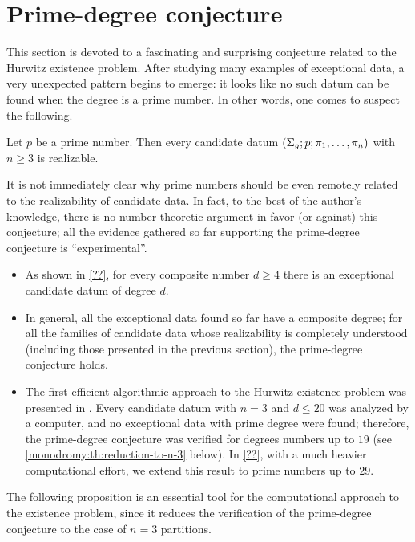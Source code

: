 \section{Prime-degree conjecture}

This section is devoted to a fascinating and surprising conjecture related to the Hurwitz existence problem. After studying many examples of exceptional data, a very unexpected pattern begins to emerge: it looks like no such datum can be found when the degree is a prime number. In other words, one comes to suspect the following.

\begin{prime-degree-conjecture*}
Let $p$ be a prime number. Then every candidate datum $(\Sigma_{g};p;\pi_1,\ldots,\pi_n)$ with $n\ge 3$ is realizable.
\end{prime-degree-conjecture*}

It is not immediately clear why prime numbers should be even remotely related to the realizability of candidate data. In fact, to the best of the author's knowledge, there is no number-theoretic argument in favor (or against) this conjecture; all the evidence gathered so far supporting the prime-degree conjecture is ``experimental''.
\begin{itemize}
\item As shown in \cref{??}, for every composite number $d\ge 4$ there is an exceptional candidate datum of degree $d$.
\item In general, all the exceptional data found so far have a composite degree; for all the families of candidate data whose realizability is completely understood (including those presented in the previous section), the prime-degree conjecture holds.
\item The first efficient algorithmic approach to the Hurwitz existence problem was presented in \cite{??}. Every candidate datum with $n=3$ and $d\le 20$ was analyzed by a computer, and no exceptional data with prime degree were found; therefore, the prime-degree conjecture was verified for degrees numbers up to $19$ (see \cref{monodromy:th:reduction-to-n-3} below). In \cref{??}, with a much heavier computational effort, we extend this result to prime numbers up to $29$.
\end{itemize}

The following proposition is an essential tool for the computational approach to the existence problem, since it reduces the verification of the prime-degree conjecture to the case of $n=3$ partitions.

